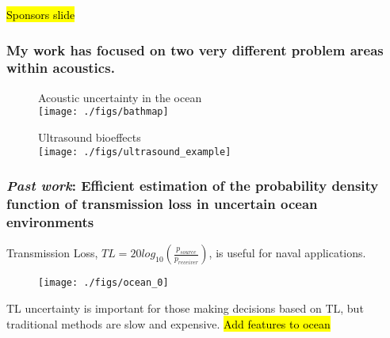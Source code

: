 
\embedfile{\jobname}
%

\newcommand{\orderof}[1]{\ensuremath{\mathcal{O}\left(#1\right)}}






\begin{frame}
  \centering
  \begin{center}
    \hl{Sponsors slide}
  \end{center}
\end{frame}

\begin{frame} \frametitle{My work has focused on two very different problem areas within acoustics.}
  \begin{minipage}{0.48\textwidth}
    \begin{figure}
      Acoustic uncertainty in the ocean \vspace*{4pt}\\
      \centering
      \texttt{[image: ./figs/bathmap]}
    \end{figure}
  \end{minipage}
  \hfill
  \begin{minipage}{0.48\textwidth}
    \begin{figure}
      \centering
      Ultrasound bioeffects \vspace*{4pt}\\
      \texttt{[image: ./figs/ultrasound\_example]}
    \end{figure}
  \end{minipage}
\end{frame}
\begin{frame} \frametitle{\textit{Past work}: Efficient estimation of the probability density function of transmission loss in uncertain ocean environments}
{\small
\vspace*{0.25cm}
Transmission Loss, $TL=20log_{10}\left(\frac{p_{source}}{p_{receiver}}\right)$, is useful for naval applications.
\vspace*{0.25cm}
\begin{figure}
  \centering
  \texttt{[image: ./figs/ocean\_0]}
\end{figure}
TL uncertainty is important for those making decisions based on TL, but traditional methods are slow and expensive.
\hl{Add features to ocean}
}
\end{frame}
